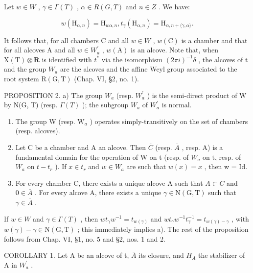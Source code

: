 Let \(w \in W\) , \(\gamma \in \Gamma(T)\) , \(\alpha \in R(G, T)\) and \(n \in Z\) . We have:

\[
w (\mathrm{H} _ {\alpha , n}) = \mathrm{H} _ {w \alpha , n}, t _ {\gamma} (\mathrm{H} _ {\alpha , n}) = \mathrm{H} _ {\alpha , n + \langle \gamma , \alpha \rangle}.
\]

It follows that, for all chambers C and all \(w \in W\) , \(w(\mathrm{C})\) is a chamber and that for all alcoves A and all \(w \in W_{a}^{\prime}\) , \(w(\mathrm{A})\) is an alcove. Note that, when \(\mathrm{X}(\mathrm{T}) \otimes \mathbf{R}\) is identified with \(t^{*}\) via the isomorphism \((2\pi i)^{-1}\delta\) , the alcoves of t and the group \(W_{a}\) are the alcoves and the affine Weyl group associated to the root system \(\mathrm{R}(\mathrm{G}, \mathrm{T})\) (Chap. VI, §2, no. 1).

PROPOSITION 2. a) The group \(W_{a}\) (resp. \(W_{a}^{\prime}\) ) is the semi-direct product of W by N(G, T) (resp. \(\Gamma(T)\) ); the subgroup \(W_{a}\) of \(W_{a}^{\prime}\) is normal.

\begin{enumerate}
\def\labelenumi{\alph{enumi})}
\setcounter{enumi}{1}
\item
  The group W (resp. \(\mathrm{W}_a\) ) operates simply-transitively on the set of chambers (resp. alcoves).
\item
  Let C be a chamber and A an alcove. Then \(\overline{C}\) (resp. \(\overline{A}\) , resp. A) is a fundamental domain for the operation of W on t (resp. of \(W_{a}\) on t, resp. of \(W_{a}\) on \(t-t_{r}\) ). If \(x \in t_{r}\) and \(w \in W_{a}\) are such that \(w(x) = x\) , then w = Id.
\item
  For every chamber C, there exists a unique alcove A such that \(A \subset C\) and \(0 \in \overline{A}\) . For every alcove A, there exists a unique \(\gamma \in \mathrm{N}(\mathrm{G}, \mathrm{T})\) such that \(\gamma \in \overline{A}\) .
\end{enumerate}

If \(w \in W\) and \(\gamma \in \Gamma(T)\) , then \(wt_{\gamma}w^{-1} = t_{w(\gamma)}\) and \(wt_{\gamma}w^{-1}t_{\gamma}^{-1} = t_{w(\gamma)-\gamma}\) , with \(w(\gamma) - \gamma \in \mathrm{N}(\mathrm{G}, \mathrm{T})\) ; this immediately implies a). The rest of the proposition follows from Chap. VI, §1, no. 5 and §2, nos. 1 and 2.

COROLLARY 1. Let A be an alcove of t, \(\overline{A}\) its closure, and \(H_{A}\) the stabilizer of A in \(W_{a}^{\prime}\) .

